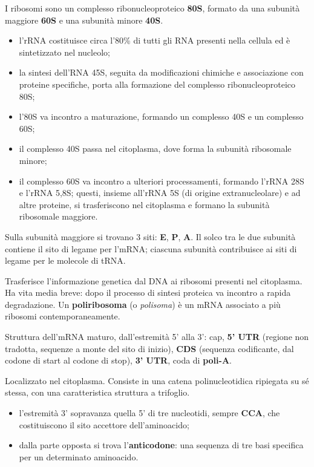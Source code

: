 I ribosomi sono un complesso ribonucleoproteico \textbf{80S}, formato da una subunità maggiore \textbf{60S} e una subunità minore \textbf{40S}.
\begin{itemize}
  \item l'rRNA costituisce circa l'80\% di tutti gli RNA presenti nella cellula ed è sintetizzato nel nucleolo;
  \item la sintesi dell'RNA 45S, seguita da modificazioni chimiche e associazione con proteine specifiche, porta alla formazione del complesso ribonucleoproteico 80S;
  \item l'80S va incontro a maturazione, formando un complesso 40S e un complesso 60S;
  \item il complesso 40S passa nel citoplasma, dove forma la subunità ribosomale minore;
  \item il complesso 60S va incontro a ulteriori processamenti, formando l'rRNA 28S e l'rRNA 5,8S; questi, insieme all'rRNA 5S (di origine extranucleolare) e ad altre proteine, si trasferiscono nel citoplasma e formano la subunità ribosomale maggiore.
\end{itemize}
Sulla subunità maggiore si trovano 3 siti: \textbf{E}, \textbf{P}, \textbf{A}. Il solco tra le due subunità contiene il sito di legame per l'mRNA; ciascuna subunità contribuisce ai siti di legame per le molecole di tRNA.

Trasferisce l'informazione genetica dal DNA ai ribosomi presenti nel citoplasma. Ha vita media breve: dopo il processo di sintesi proteica va incontro a rapida degradazione. Un \textbf{poliribosoma} (o \textit{polisoma}) è un mRNA associato a più ribosomi contemporaneamente.

Struttura dell'mRNA maturo, dall'estremità 5' alla 3': cap, \textbf{5' UTR} (regione non tradotta, sequenze a monte del sito di inizio), \textbf{CDS} (sequenza codificante, dal codone di start al codone di stop), \textbf{3' UTR}, coda di \textbf{poli-A}.

Localizzato nel citoplasma. Consiste in una catena polinucleotidica ripiegata su sé stessa, con una caratteristica struttura a trifoglio.
\begin{itemize}
  \item l'estremità 3' sopravanza quella 5' di tre nucleotidi, sempre \textbf{CCA}, che costituiscono il sito accettore dell'aminoacido;
  \item dalla parte opposta si trova l'\textbf{anticodone}: una sequenza di tre basi specifica per un determinato aminoacido.
\end{itemize}

